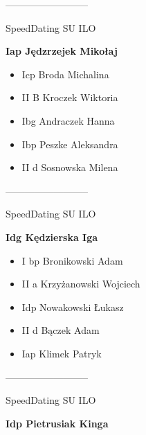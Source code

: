 \documentclass[a4paper,10pt]{article}
\begin{document}
\begin{multicols}{3}
\begin{minipage}[l]{\textwidth}
\begin{itemize}
    \end{itemize}



\end{minipage}



\begin{minipage}[l]{\textwidth}
--------------------------

  \footnotesize{SpeedDating SU ILO}

  \bfseries{Iap Jędzrzejek Mikołaj}

  \begin{itemize}
    \item Icp Broda Michalina
    \item II B Kroczek Wiktoria
    \item Ibg Andraczek Hanna
    \item Ibp Peszke Aleksandra
    \item II d Sosnowska Milena

    \end{itemize}



\end{minipage}



\begin{minipage}[l]{\textwidth}
--------------------------

  \footnotesize{SpeedDating SU ILO}

  \bfseries{Idg Kędzierska Iga}

  \begin{itemize}
    \item I bp Bronikowski Adam
    \item II a Krzyżanowski Wojciech
    \item Idp Nowakowski Łukasz
    \item II d Bączek Adam
    \item Iap Klimek Patryk

    \end{itemize}



\end{minipage}



\begin{minipage}[l]{\textwidth}
--------------------------

  \footnotesize{SpeedDating SU ILO}

  \bfseries{Idp Pietrusiak Kinga}


\end{minipage}
\end{multicols}
\end{document}
